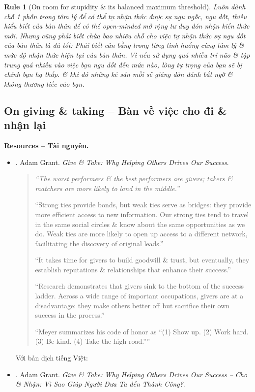 \documentclass[12pt]{article}
\newtheorem{Rule}{Rule}
\begin{document}
\begin{Rule}[On room for stupidity \& its balanced maximum threshold]
	Luôn dành chỗ 1 phần trong tâm lý để có thể tự nhận thức được sự ngu ngốc, ngu dốt, thiếu hiểu biết của bản thân để có thể open-minded mở rộng tư duy đón nhận kiến thức mới. Nhưng cũng phải biết chừa bao nhiêu chỗ cho việc tự nhận thức sự ngu dốt của bản thân là đủ tốt: Phải biết cân bằng trong từng tình huống cùng tâm lý \& mức độ nhận thức hiện tại của bản thân. Vì nếu sử dụng quá nhiều trí não \& tập trung quá nhiều vào việc bạn ngu dốt đến mức nào, lòng tự trọng của bạn sẽ bị chính bạn hạ thấp. \& khi đó những kẻ săn mồi sẽ giáng đòn đánh bất ngờ \& không thương tiếc vào bạn.
\end{Rule}


\subsection{On giving \& taking -- Bàn về việc cho đi \& nhận lại}
\noindent\textbf{\textsf{Resources -- Tài nguyên.}}
\begin{itemize}
	\item \cite{Grant_give_take}. {\sc Adam Grant}. {\it Give \& Take: Why Helping Others Drives Our Success}.
	\begin{quotation}\it
		``The worst performers \& the best performers are givers; takers \& matchers are more likely to land in the middle.''
		
		``Strong ties provide bonds, but weak ties serve as bridges: they provide more efficient access to new information. Our strong ties tend to travel in the same social circles \& know about the same opportunities as we do. Weak ties are more likely to open up access to a different network, facilitating the discovery of original leads.''
		
		``It takes time for givers to build goodwill \& trust, but eventually, they establish reputations \& relationships that enhance their success.''
		
		``Research demonstrates that givers sink to the bottom of the success ladder. Across a wide range of important occupations, givers are at a disadvantage: they make others better off but sacrifice their own success in the process.''
		
		``Meyer summarizes his code of honor as ``(1) Show up. (2) Work hard. (3) Be kind. (4) Take the high road.''''
	\end{quotation}
	Với bản dịch tiếng Việt:
	\item \cite{Grant_give_take_VN}. {\sc Adam Grant}. {\it Give \& Take: Why Helping Others Drives Our Success -- Cho \& Nhận: Vì Sao Giúp Người Đưa Ta đến Thành Công?}.
\end{itemize}
\end{document}
